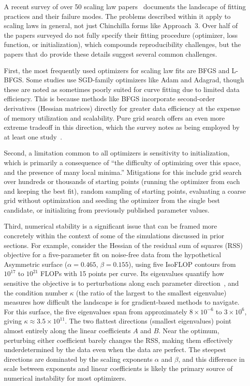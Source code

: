\documentclass[11pt]{article}
\begin{document}
A recent survey of over 50 scaling law papers~\citep{misfitting} documents the
landscape of fitting practices and their failure modes. The problems described within it apply to scaling laws in general, not just
Chinchilla forms like Approach~3. Over half of the papers surveyed do not fully specify
their fitting procedure (optimizer, loss function, or initialization), which
compounds reproducibility challenges, but the papers that do provide these
details suggest several common challenges.

First, the most frequently used optimizers for scaling law fits are BFGS and L-BFGS. Some
studies use SGD-family optimizers like Adam and Adagrad, though these are noted
as sometimes poorly suited for curve fitting due to limited data efficiency.
This is because methods like BFGS incorporate second-order derivatives (Hessian
matrices) directly for greater data efficiency at the expense of memory
utilization and scalability. Pure grid search offers an even more extreme
tradeoff in this direction, which the survey notes as being employed by at
least one study~\citep{data_filtering_scaling}.

Second, a limitation common to all optimizers is sensitivity to initialization, which
is primarily a consequence of ``the difficulty of optimizing over this space,
and the presence of many local minima.'' Mitigations for this include
grid search over hundreds or thousands of starting points (running the
optimizer from each and keeping the best fit), random sampling of starting
points, evaluating a coarse grid without optimization and seeding the optimizer
from the single best candidate, or initializing from previously published
parameter values.

Third, numerical stability is a significant issue that can be framed more
concretely within the context of some of the simulations discussed in prior
sections. For example, consider the Hessian of the residual sum of
squares (RSS) objective for a five-parameter fit on noise-free data from the
hypothetical Asymmetric surface ($\alpha = 0.465$,
$\beta = 0.155$), using five IsoFLOP contours from $10^{17}$ to $10^{21}$
FLOPs with 15 points per curve. Its eigenvalues quantify how sensitive the
objective is to perturbations along each parameter
direction~\citep{hessian_optimization}, and the condition number $\kappa$ (the
ratio of the largest to the smallest eigenvalue) measures how difficult the
landscape is for gradient-based methods to navigate. For this surface, the five
eigenvalues span from approximately $8 \times 10^{-6}$ to $3 \times 10^{6}$,
giving $\kappa \approx 3.5 \times 10^{11}$. The two flattest directions
(smallest eigenvalues) point almost entirely along the linear coefficients $A$
and $B$. Near the optimum, perturbing either coefficient barely changes the
RSS, making them effectively underdetermined by the data even when the data are
perfect. The steepest directions are dominated by the scaling exponents
$\alpha$ and $\beta$, and this difference in scale between exponents and linear
coefficients is likely the primary source of numerical instability for most
optimizers.
\end{document}
